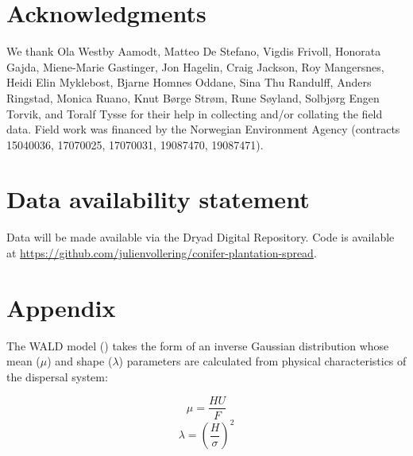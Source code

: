 \documentclass[
]{article}
\begin{document}
\section{Acknowledgments}\label{acknowledgments}

We thank Ola Westby Aamodt, Matteo De Stefano, Vigdis Frivoll, Honorata Gajda,
Miene-Marie Gastinger, Jon Hagelin, Craig Jackson, Roy Mangersnes, Heidi Elin
Myklebost, Bjarne Homnes Oddane, Sina Thu Randulff, Anders Ringstad, Monica
Ruano, Knut Børge Strøm, Rune Søyland, Solbjørg Engen Torvik, and Toralf Tysse
for their help in collecting and/or collating the field data. Field work was
financed by the Norwegian Environment Agency (contracts 15040036, 17070025,
17070031, 19087470, 19087471).

\section{Data availability statement}\label{data-availability-statement}

Data will be made available via the Dryad Digital Repository. Code is available
at \url{https://github.com/julienvollering/conifer-plantation-spread}.

\newpage

\section{Appendix}\label{appendix}

The WALD model () takes the form of an
inverse Gaussian distribution whose mean (\(\mu\)) and shape (\(\lambda\))
parameters are calculated from physical characteristics of the dispersal system:

\begin{equation}
\mu = \frac{HU}{F}
\end{equation} \begin{equation}
\lambda = \left(\frac{H}{\sigma}\right)^2
\end{equation}
\end{document}
